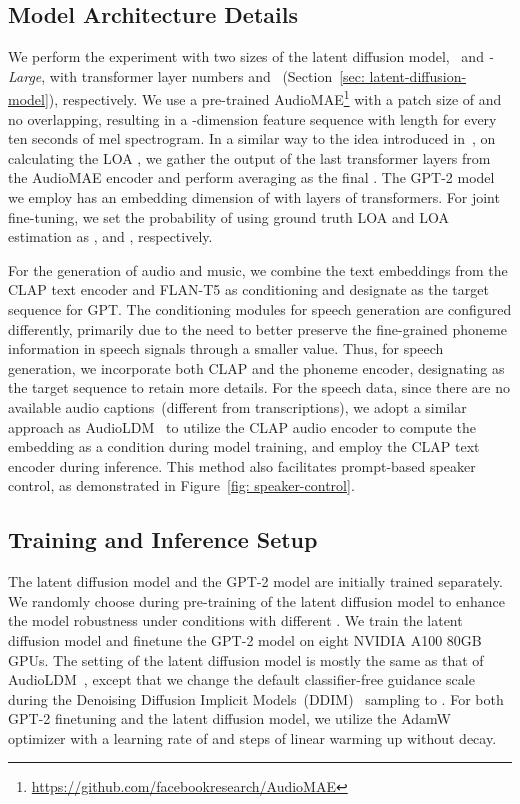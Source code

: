 \documentclass[lettersize,journal]{IEEEtran}
\begin{document}
\subsection{Model Architecture Details} 
\noindent
We perform the experiment with two sizes of the latent diffusion model, \vModelName~and \vModelName\textit{-Large}, with transformer layer numbers  and ~(Section~\ref{sec: latent-diffusion-model}), respectively. We use a pre-trained AudioMAE\footnote{\url{https://github.com/facebookresearch/AudioMAE}} with a patch size of  and no overlapping, resulting in a -dimension feature sequence with length  for every ten seconds of mel spectrogram. In a similar way to the idea introduced in~\cite{chen2023speech}, on calculating the LOA , we gather the output of the last  transformer layers from the AudioMAE encoder and perform averaging as the final . The GPT-2 model we employ has an embedding dimension of  with  layers of transformers. For joint fine-tuning, we set the probability of using ground truth LOA  and LOA estimation  as , and , respectively.

For the generation of audio and music, we combine the text embeddings from the CLAP text encoder and FLAN-T5 as conditioning and designate  as the target sequence for GPT. The conditioning modules for speech generation are configured differently, primarily due to the need to better preserve the fine-grained phoneme information in speech signals through a smaller  value. Thus, for speech generation, we incorporate both CLAP and the phoneme encoder, designating  as the target sequence to retain more details. For the speech data, since there are no available audio captions~(different from transcriptions), we adopt a similar approach as AudioLDM~\cite{liu2023audioldm} to utilize the CLAP audio encoder to compute the embedding as a condition during model training, and employ the CLAP text encoder during inference. This method also facilitates prompt-based speaker control, as demonstrated in Figure~\ref{fig: speaker-control}.

\subsection{Training and Inference Setup}
\noindent
The latent diffusion model and the GPT-2 model are initially trained separately. We randomly choose  during pre-training of the latent diffusion model to enhance the model robustness under conditions  with different . 
We train the latent diffusion model and finetune the GPT-2 model on eight NVIDIA A100 80GB GPUs.
The setting of the latent diffusion model is mostly the same as that of AudioLDM~\cite{liu2023audioldm}, except that we change the default classifier-free guidance scale during the Denoising Diffusion Implicit Models~(DDIM)~\cite{song2020denoising-ddim} sampling to .
For both GPT-2 finetuning and the latent diffusion model, we utilize the AdamW~\cite{loshchilov2017decoupled} optimizer with a learning rate of  and  steps of linear warming up without decay. 
\end{document}
